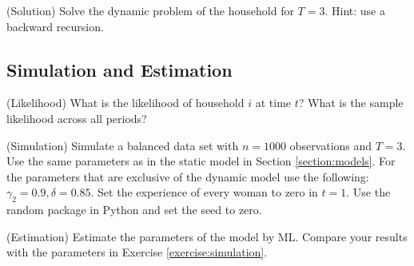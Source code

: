 \begin{exercise} (Solution)
Solve the dynamic problem of the household for $T=3$. Hint: use a backward recursion.
\end{exercise}

\subsection{Simulation and Estimation}

\begin{exercise} (Likelihood)
What is the likelihood of household $i$ at time $t$? What is the sample likelihood across all periods?
\end{exercise}

\begin{exercise} (Simulation) \label{exercise:simulation}
Simulate a balanced data set with $n = 1000$ observations and $T=3$. Use the same parameters as in the static model in Section \ref{section:models}. For the parameters that are exclusive of the dynamic model use the following: $\gamma_2 = 0.9,\delta = 0.85$. Set the experience of every woman to zero in $t=1$. Use the random package in Python and set the seed to zero.
\end{exercise}

\begin{exercise} (Estimation)
Estimate the parameters of the model by ML. Compare your results with the parameters in Exercise \ref{exercise:simulation}.
\end{exercise} 